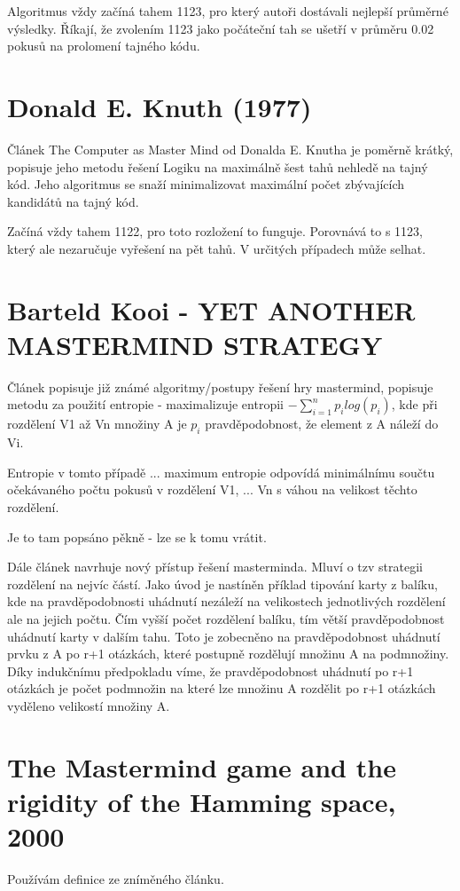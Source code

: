 Algoritmus vždy začíná tahem 1123, pro který autoři dostávali nejlepší průměrné výsledky. Říkají, že zvolením 1123 jako počáteční tah se ušetří v průměru 0.02 pokusů na prolomení tajného kódu.



\section{Donald E. Knuth (1977) \cite{donald_e__knuth_1977}}

Článek The Computer as Master Mind od Donalda E. Knutha je poměrně krátký, popisuje jeho metodu řešení Logiku na maximálně šest tahů nehledě na tajný kód. Jeho algoritmus se snaží minimalizovat maximální počet zbývajících kandidátů na tajný kód. 

Začíná vždy tahem 1122, pro toto rozložení to funguje. Porovnává to s 1123, který ale nezaručuje vyřešení na pět tahů. V určitých případech může selhat. 

\section{Barteld Kooi - YET ANOTHER MASTERMIND STRATEGY \cite{kooi}}

Článek popisuje již známé algoritmy/postupy řešení hry mastermind,
popisuje metodu za použití entropie - maximalizuje entropii $-\sum_{i=1}^n p_i log(p_i)$, kde při rozdělení V1 až Vn množiny A je $p_i$ pravděpodobnost, že element z A náleží do Vi. 

Entropie v tomto případě ... maximum entropie odpovídá minimálnímu součtu očekávaného počtu pokusů v rozdělení V1, ... Vn s váhou na velikost těchto rozdělení. 

Je to tam popsáno pěkně - lze se k tomu vrátit.

Dále článek navrhuje nový přístup řešení masterminda. Mluví o tzv strategii rozdělení na nejvíc částí. Jako úvod je nastíněn příklad tipování karty z balíku, kde na pravděpodobnosti uhádnutí nezáleží na velikostech jednotlivých rozdělení ale na jejich počtu. Čím vyšší počet rozdělení balíku, tím větší pravděpodobnost uhádnutí karty v dalším tahu. Toto je zobecněno na pravděpodobnost uhádnutí prvku z A po r+1 otázkách, které postupně rozdělují množinu A na podmnožiny. Díky indukčnímu předpokladu víme, že pravděpodobnost uhádnutí po r+1 otázkách je počet podmnožin na které lze množinu A rozdělit po r+1 otázkách vyděleno velikostí množiny A. 


\section{The Mastermind game and the rigidity of the Hamming space, 2000 \cite{866673}}
Používám definice ze zníměného článku.


